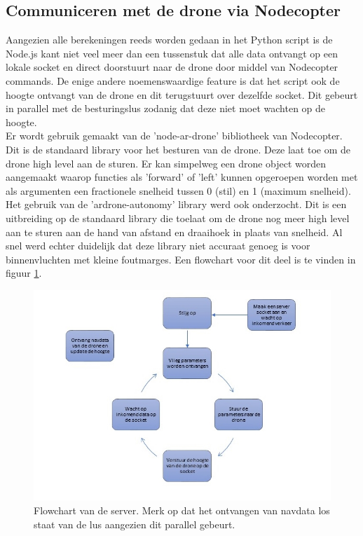 \subsection{Communiceren met de drone via Nodecopter}
Aangezien alle berekeningen reeds worden gedaan in het Python script is de Node.js kant niet veel meer dan een tussenstuk dat alle data ontvangt op een lokale socket en direct doorstuurt naar de drone door middel van Nodecopter commands. De enige andere noemenswaardige feature is dat het script ook de hoogte ontvangt van de drone en dit terugstuurt over dezelfde socket. Dit gebeurt in parallel met de besturingslus zodanig dat deze niet moet wachten op de hoogte.\\

Er wordt gebruik gemaakt van de 'node-ar-drone' bibliotheek van Nodecopter. Dit is de standaard library voor het besturen van de drone. Deze laat toe om de drone high level aan de sturen. Er kan simpelweg een drone object worden aangemaakt waarop functies als 'forward' of 'left' kunnen opgeroepen worden met als argumenten een fractionele snelheid tussen 0 (stil) en 1 (maximum snelheid).\\

Het gebruik van de 'ardrone-autonomy' library werd ook onderzocht. Dit is een uitbreiding op de standaard library die toelaat om de drone nog meer high level aan te sturen aan de hand van afstand en draaihoek in plaats van snelheid. Al snel werd echter duidelijk dat deze library niet accuraat genoeg is  voor binnenvluchten met kleine foutmarges. Een flowchart voor dit deel is te vinden in figuur \ref{fig:flowchart_server}.
\begin{figure}[p]
	\centering
	\includegraphics[width=\textwidth]{images/node_server_flowchart}
	\caption[Flowchart van de server]{Flowchart van de server. Merk op dat het ontvangen van navdata los staat van de lus aangezien dit parallel gebeurt.}
	\label{fig:flowchart_server}
\end{figure}

